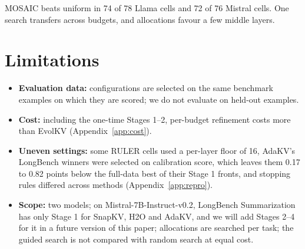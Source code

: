 \documentclass[11pt]{article}
\begin{document}
MOSAIC beats uniform in 74 of 78 Llama cells and 72 of 76 Mistral cells. One search transfers across budgets, and allocations favour a few middle layers.

\clearpage
\section*{Limitations}

\begin{itemize}
\item \textbf{Evaluation data:} configurations are selected on the same benchmark examples on which they are scored; we do not evaluate on held-out examples.
\item \textbf{Cost:} including the one-time Stages 1--2, per-budget refinement costs more than EvolKV (Appendix~\ref{app:cost}).
\item \textbf{Uneven settings:} some RULER cells used a per-layer floor of 16, AdaKV's LongBench winners were selected on calibration score, which leaves them 0.17 to 0.82 points below the full-data best of their Stage 1 fronts, and stopping rules differed across methods (Appendix~\ref{app:repro}).
\item \textbf{Scope:} two models; on Mistral-7B-Instruct-v0.2, LongBench Summarization has only Stage 1 for SnapKV, H2O and AdaKV, and we will add Stages 2--4 for it in a future version of this paper; allocations are searched per task; the guided search is not compared with random search at equal cost.
\end{itemize}

\FloatBarrier




\end{document}
